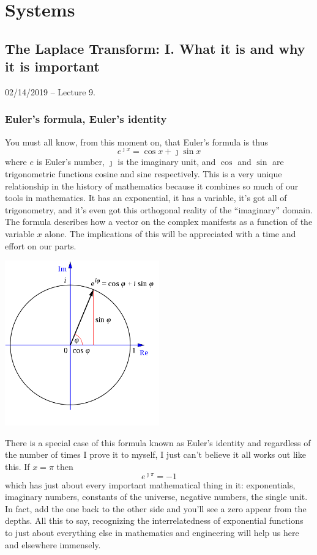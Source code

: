 \documentclass[11pt]{book}
\begin{document}
\part{Systems}



\chapter{The Laplace Transform: I. What it is and why it is important}
02/14/2019 – Lecture 9. 
\minitoc
\newpage
\section{Euler's formula, Euler's identity }
You must all know, from this moment on, that Euler's formula is thus
\begin{equation}
	e^{\jmath x} = \cos x + \jmath \sin x
\end{equation}
where $e$ is Euler's number, $\jmath$ is the imaginary unit, and $\cos$ and $\sin$ are trigonometric functions cosine and sine respectively. This is a very unique relationship in the history of mathematics because it combines so much of our tools in mathematics. It has an exponential, it has a variable, it's got all of trigonometry, and it's even got this orthogonal reality of the ``imaginary'' domain. The formula describes how a vector on the complex manifests as a function of the variable $x$ alone. The implications of this will be appreciated with a time and effort on our parts.

\begin{center}
	\includegraphics[width=0.5\textwidth]{figures/09.01.png}
\end{center}
There is a special case of this formula known as Euler's identity and regardless of the number of times I prove it to myself, I just can't believe it all works out like this. If $x = \pi$ then
\begin{equation}
	e^{\jmath \pi} = -1
\end{equation}
which has just about every important mathematical thing in it: exponentials, imaginary numbers, constants of the universe, negative numbers, the single unit. In fact, add the one back to the other side and you'll see a zero appear from the depths. All this to say, recognizing the interrelatedness of exponential functions to just about everything else in mathematics and engineering will help us here and elsewhere immensely.
\end{document}
